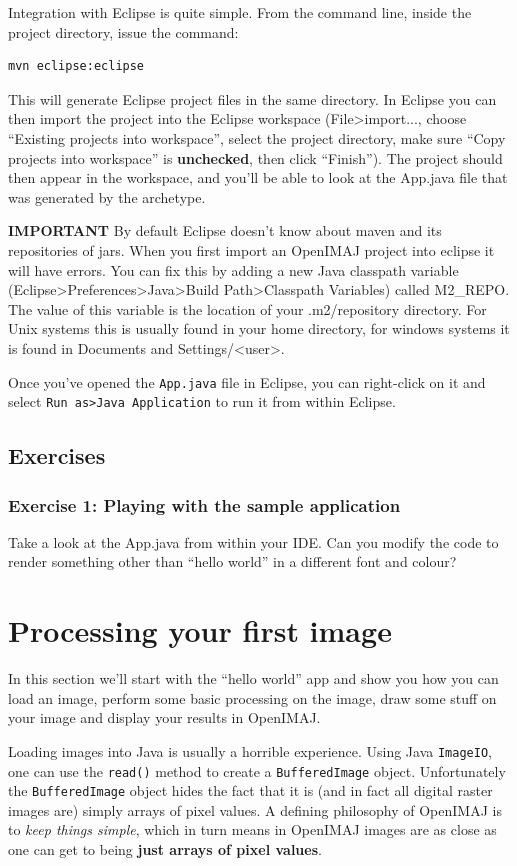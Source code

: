 \documentclass[10pt,a4paper,twoside,extrafontsizes]{memoir}
\begin{document}
Integration with Eclipse is quite simple. From the command line, inside the project directory, 
issue the command:
\begin{lstlisting}[language=bash]
mvn eclipse:eclipse
\end{lstlisting}
This will generate Eclipse project files in the same directory. In Eclipse you can then import 
the project into the Eclipse workspace (File>import..., choose ``Existing projects into workspace'', 
select the project directory, make sure ``Copy projects into workspace'' is \textbf{unchecked}, then click
 ``Finish''). The project should then appear in the workspace, and you'll be able to look at the 
App.java file that was generated by the archetype.

\textbf{IMPORTANT} By default Eclipse doesn't know about maven and its repositories of jars. When you 
first import an OpenIMAJ project into eclipse it will have errors. You can fix this by adding 
a new Java classpath variable (Eclipse>Preferences>Java>Build Path>Classpath Variables) 
called M2\_REPO. The value of this variable is the location of your .m2/repository directory. 
For Unix systems this is usually found in your home directory, for windows systems it is found 
in Documents and Settings/<user>.

Once you've opened the \verb+App.java+ file in Eclipse, you can right-click on it and select 
\verb+Run as>Java Application+ to run it from within Eclipse.

\section*{Exercises}
\subsection{Exercise 1: Playing with the sample application}
Take a look at the App.java from within your IDE. Can you modify the code to render something 
other than ``hello world'' in a different font and colour? 

\chapter{Processing your first image}
In this section we'll start with the ``hello world'' app and show you how you can load an image, 
perform some basic processing on the image, draw some stuff on your image and display your 
results in OpenIMAJ.

Loading images into Java is usually a horrible experience. Using Java \verb+ImageIO+, one can use the 
\verb+read()+ method to create a \verb+BufferedImage+ object. Unfortunately the \verb+BufferedImage+ 
object hides the fact that it is (and in fact all digital raster images are) simply arrays of pixel 
values. A defining philosophy of OpenIMAJ is to \emph{keep things simple}, which in turn means in OpenIMAJ 
images are as close as one can get to being \textbf{just arrays of pixel values}.
\end{document}
